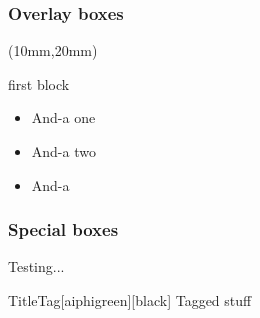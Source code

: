 \documentclass[mathserif, fleqn, aspectratio=169]{beamer}
\begin{document}
\begin{frame}\frametitle{Overlay boxes}
  \begin{textblock*}{60mm} (10mm,20mm)
    \begin{itembox}{first block}
      \begin{itemize}
      \item And-a one
      \item And-a two
      \item And-a
      \end{itemize}
    \end{itembox}
  \end{textblock*}


\end{frame}

\begin{frame}\frametitle{Special boxes}
  \begin{fancybox}{Testing...}
    \lipsum[2]
  \end{fancybox}

  \begin{tagbox}{Title}{Tag}[aiphigreen][black]
    Tagged stuff
  \end{tagbox}
\end{frame}
\end{document}
